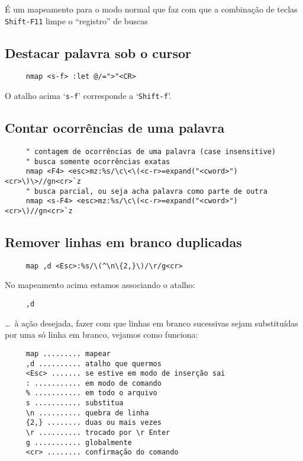 É um mapeamento para o modo normal que faz com que a combinação de
teclas \verb|Shift-F11| limpe o ``registro'' de buscas

\subsection{Destacar palavra sob o cursor }
\label{Destacar palavra sob o cursor }

\begin{verbatim}
     nmap <s-f> :let @/=">"<CR>
\end{verbatim}

O atalho acima `\verb|s-f|' corresponde a `\verb|Shift-f|'.

\subsection{Contar ocorrências de uma palavra} %
\label{sub:Contar ocorrências de uma palavra}

\begin{verbatim}
     " contagem de ocorrências de uma palavra (case insensitive)
     " busca somente ocorrências exatas
     nmap <F4> <esc>mz:%s/\c\<\(<c-r>=expand("<cword>")<cr>\)\>//gn<cr>`z
     " busca parcial, ou seja acha palavra como parte de outra
     nmap <s-F4> <esc>mz:%s/\c\(<c-r>=expand("<cword>")<cr>\)//gn<cr>`z
\end{verbatim}



\subsection{Remover linhas em branco duplicadas }
\label{Remover linhas em branco duplicadas }

\begin{verbatim}
     map ,d <Esc>:%s/\(^\n\{2,}\)/\r/g<cr>
\end{verbatim}

No mapeamento acima estamos associando o atalho:

\begin{verbatim}
     ,d
\end{verbatim}

\dots~à ação desejada, fazer com que linhas em branco sucessivas sejam
substituídas por uma só linha em branco, vejamos como funciona:

\begin{verbatim}
     map ......... mapear
     ,d .......... atalho que quermos
     <Esc> ....... se estive em modo de inserção sai
     : ........... em modo de comando
     % ........... em todo o arquivo
     s ........... substitua
     \n .......... quebra de linha
     {2,} ........ duas ou mais vezes
     \r .......... trocado por \r Enter
     g ........... globalmente
     <cr> ........ confirmação do comando
\end{verbatim}

